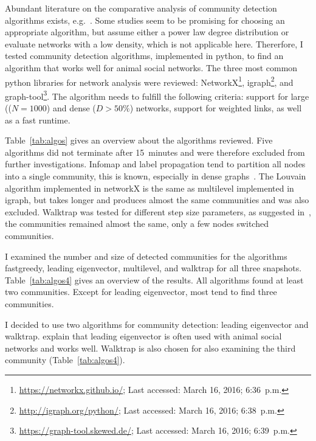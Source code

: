 Abundant literature on the comparative analysis of community detection algorithms exists, e.g.~\cite{yang2016comparative, harenberg2014community}.
Some studies seem to be promising for choosing an appropriate algorithm, but assume either a power law degree distribution or
evaluate networks with a low density, which is not applicable here.
Thererfore, I tested community detection algorithms, implemented in python, to find an algorithm that works well for animal social networks. The three most common python libraries for network analysis were reviewed: NetworkX\footnote{\url{https://networkx.github.io/}; Last accessed: March 16, 2016; 6:36~p.m.}, igraph\footnote{\url{http://igraph.org/python/}; Last accessed: March 16, 2016; 6:38~p.m.}, and graph-tool\footnote{\url{https://graph-tool.skewed.de/}; Last accessed: March 16, 2016; 6:39~p.m.}.
The algorithm needs to fulfill the following criteria: support for large (($N=1000$) and dense ($D>50\%$) networks, support for weighted links, as well as a fast runtime.




Table~\ref{tab:algos} gives an overview about the algorithms reviewed.
Five algorithms did not terminate after 15~minutes and were therefore excluded from further investigations.
Infomap and label propagation tend to partition all nodes into a single community, this is known, especially in dense graphs~\cite{yang2016comparative, fortunato2010community}.
The Louvain algorithm implemented in networkX is the same as multilevel implemented in igraph, but takes longer and produces almost the same communities and was also excluded.
Walktrap was tested for different step size parameters, as suggested in~\cite{pons2005computing}, the communities remained almost the same, only a few nodes switched communities.

I examined the number and size of detected communities for the algorithms fastgreedy, leading eigenvector, multilevel, and walktrap for all three snapshots. Table~\ref{tab:algos4} gives an overview of the results.
All algorithms found at least two communities.
Except for leading eigenvector, most tend to find three communities.

I decided to use two algorithms for community detection: leading eigenvector and walktrap. \textcite{farine2015constructing} explain that leading eigenvector is often used with animal social networks and works well. Walktrap is also chosen for also examining the third community (Table~\ref{tab:algos4}).



